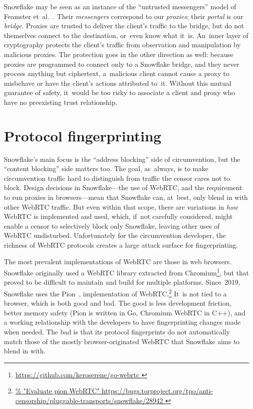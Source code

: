 \documentclass[letterpaper,twocolumn]{article}
\newcommand{\firstterm}[1]{\textit{#1}}
\newlength{\urlfootnotesize}
\newcommand{\urlfootnote}[1]{\footnote{
\raggedright\hangindent\footnotemargin%
\fontsize{\urlfootnotesize}{\urlfootnotesize}\selectfont%
\url{#1}
}}
\begin{document}
Snowflake may be seen as an instance of the
``untrusted messengers'' model of Feamster et~al.~\cite[\S 3]{Feamster2003a}.
Their \firstterm{messengers} correspond to our \firstterm{proxies};
their \firstterm{portal} is our \firstterm{bridge}.
Proxies are trusted to deliver the client's traffic to the bridge,
but do not themselves connect to the destination, or~even know what it~is.
An~inner layer of cryptography protects the client's traffic
from observation and manipulation by malicious proxies.
The protection goes in the other direction as well:
because proxies are programmed to connect only to a Snowflake bridge,
and they never process anything but ciphertext,
a~malicious client cannot cause a proxy to misbehave
or have the client's actions attributed to~it.
Without this mutual guarantee of safety,
it~would be too risky to associate a client and proxy
who have no preexisting trust relationship.

\section{Protocol fingerprinting}
\label{sec:fingerprinting}


Snowflake's main focus is the ``address blocking'' side of circumvention,
but the ``content blocking'' side matters too.
The goal, as~always, is to make circumvention traffic
hard to distinguish from traffic the censor cares not to block.
Design decisions in Snowflake---the use of WebRTC,
and the requirement to run proxies in browsers---mean
that Snowflake can, at~best, only blend in with other WebRTC traffic.
But even within that scope,
there are variations in \emph{how}
WebRTC is implemented and used,
which, if~not carefully considered, might enable a censor
to selectively block only Snowflake,
leaving other uses of WebRTC undisturbed.
Unfortunately for the circumvention developer,
the richness of WebRTC protocols
creates a large attack surface for fingerprinting.

The most prevalent implementations of WebRTC are those in web browsers.
Snowflake originally used a WebRTC library extracted from Chromium\urlfootnote{
https://github.com/keroserene/go-webrtc
},
but that proved to be difficult to maintain
and build for multiple platforms.
Since~2019, Snowflake uses the Pion~\cite{pion-webrtc},
implementation of WebRTC.\urlfootnote{
https://bugs.torproject.org/tpo/anti-censorship/pluggable-transports/snowflake/28942
}
It~is not tied to a browser,
which is both good and bad.
The good is less development friction,
better memory safety
(Pion is written in Go, Chromium WebRTC in C++),
and a working relationship with the developers
to have fingerprinting changes made when needed.
The bad is that its protocol fingerprints
do not automatically match those of the mostly browser-originated
WebRTC that Snowflake aims to blend in with.
\end{document}
